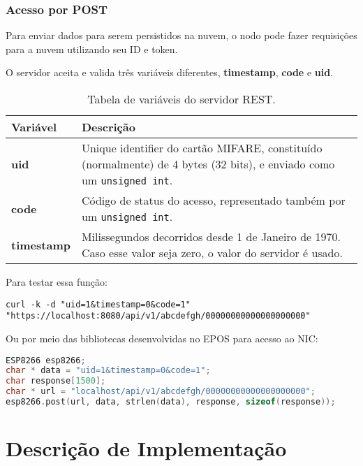 \documentclass[11pt]{article}
\begin{document}
\subsubsection{Acesso por POST}

Para enviar dados para serem persistidos na nuvem, o nodo pode fazer requisições para a nuvem utilizando seu ID e token.



O servidor aceita e valida três variáveis diferentes, \textbf{timestamp}, \textbf{code} e \textbf{uid}.

\begin{table}[!ht]
\centering
\caption{Tabela de variáveis do servidor REST.}
\vspace{0.5cm}
\label{tabela-comandos}
\renewcommand*{\arraystretch}{1.7}
\begin{tabularx}{\linewidth}{|X|X|}
\hline
\textbf{Variável} & \textbf{Descrição} \\
\hline
\textbf{uid} & Unique identifier do cartão MIFARE, constituído (normalmente) de 4 bytes (32 bits), e enviado como um \texttt{unsigned int}. \\ \hline
\textbf{code} & Código de status do acesso, representado também por um \texttt{unsigned int}. \\ \hline
\textbf{timestamp} & Milissegundos decorridos desde 1 de Janeiro de 1970. Caso esse valor seja zero, o valor do servidor é usado. \\
\hline
\end{tabularx}
\end{table}

Para testar essa função:

\begin{lstlisting}
curl -k -d "uid=1&timestamp=0&code=1" "https://localhost:8080/api/v1/abcdefgh/00000000000000000000"
\end{lstlisting}

Ou por meio das bibliotecas desenvolvidas no EPOS para acesso ao NIC:

\begin{lstlisting}[language=C++]
ESP8266 esp8266;
char * data = "uid=1&timestamp=0&code=1";
char response[1500];
char * url = "localhost/api/v1/abcdefgh/00000000000000000000";
esp8266.post(url, data, strlen(data), response, sizeof(response));
\end{lstlisting}

\newpage
\section{Descrição de Implementação}
\end{document}
